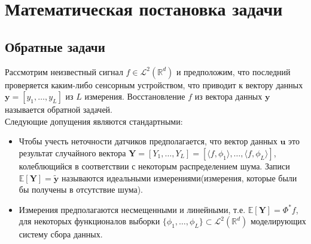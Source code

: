 \documentclass[a4paper,12pt]{article}
\theoremstyle{plain}
\theoremstyle{definition}
\theoremstyle{remark}
\newcommand{\nl}{\\ \indent}
\begin{document}
\tableofcontents
\newpage
\section{Математическая постановка задачи}
\subsection{Обратные задачи}
Рассмотрим неизвестный сигнал 
$f \in \mathcal{L}^2(\mathbb{R}^d)$ и предположим, 
что последний проверяется каким-либо сенсорным устройством, 
что приводит к вектору данных 
$\textbf{y} = [y_1, \ldots, y_L]$ из $L$ измерения. 
Восстановление $f$ из вектора данных $\textbf{y}$ 
называется обратной задачей.
\nl
Следующие допущения являются стандартными:
\begin{itemize}
\item Чтобы учесть неточности датчиков предполагается, 
что вектор данных $\textbf{u}$ это результат 
случайного вектора 
$\textbf{Y} = [Y_1, \ldots , Y_L] =
\left[ 
\langle f, \phi_1 \rangle,
\ldots ,
\langle f, \phi_L \rangle
\right]$, 
колеблющийся в соответствии с некоторым распределением шума. 
Записи $\mathbb{E}[\textbf{Y}] = \widetilde{\textbf{y}}$ 
называются идеальными измерениями(измерения, которые были бы получены в отсутствие шума).
\item Измерения предполагаются несмещенными и линейными,
т.е.
$\mathbb{E}[\textbf{Y}] = \Phi^{*}f$, 
для некоторых функционалов выборки 
$\{ \phi_1, \ldots , \phi_L \} 
\subset \mathcal{L}^2(\mathbb{R}^d)$ 
моделирующих систему сбора данных.
\end{itemize}
\end{document}
